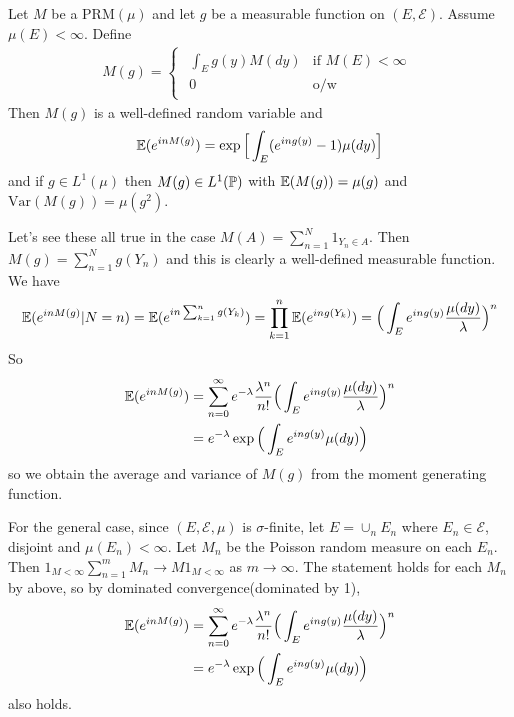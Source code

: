 \documentclass[12pt,a4paper]{report}
\newenvironment{proof}
{\begin{changemargin}{1cm}{0.5cm} 
	}%
	{\end{changemargin}
}
\begin{document}
 Let $M$ be a $\text{PRM}(\mu)$ and let $g$ be a measurable function on $(E, \mathscr{E})$. Assume $\mu(E) < \infty$. Define
\begin{align*}
M(g) = \begin{cases}
\begin{array}{ll}
\int_E g(y) M(dy) & \text{if  } M(E) < \infty \\
0 & \text{o/w}
\end{array}
\end{cases}
\end{align*}
Then $M(g)$ is a well-defined random variable and 
\begin{align*}
\mathbb{E}(e^{inM(g)}) = \exp \Big[ \int_E (e^{ing(y)} -1) \mu(dy) \Big]
\end{align*}
and if $g\in L^1(\mu)$ then $M(g) \in L^1(\mathbb{P})$ with $\mathbb{E}(M(g)) = \mu(g)$ and $\text{Var}(M(g)) = \mu(g^2)$.
\begin{proof}
\pf Let's see these all true in the case $M(A) = \sum_{n=1}^N 1_{Y_n \in A}$. Then $M(g) = \sum_{n=1}^N g(Y_n)$ and this is clearly a well-defined measurable function. We have
\begin{align*}
\mathbb{E}(e^{in M(g)} | N=n) = \mathbb{E}( e^{in \sum_{k=1}^n g(Y_k) }) =\prod_{k=1}^n \mathbb{E}( e^{in  g(Y_k) }) = \Big( \int_E e^{in g(y)} \frac{\mu(dy)}{\lambda} \Big)^n
\end{align*}
So 
\begin{align*}
\mathbb{E}(e^{in M(g)}) &= \sum_{n=0}^{\infty} e^{-\lambda} \frac{\lambda^n}{n!} \Big( \int_E e^{ing(y)} \frac{\mu(dy)}{\lambda} \Big)^n \\
&= e^{-\lambda} \exp \Big( \int_E e^{ing(y)} \mu(dy) \Big)
\end{align*}
so we obtain the average and variance of $M(g)$ from the moment generating function.

\quad For the general case, since $(E, \mathscr{E},\mu)$ is $\sigma$-finite, let $E = \cup_n E_n$ where $E_n \in \mathscr{E}$, disjoint and $\mu(E_n) < \infty$. Let $M_n$ be the Poisson random measure on each $E_n$. Then $1_{M<\infty} \sum_{n=1}^{m} M_{n} \rightarrow M 1_{M<\infty}$ as $m\rightarrow \infty$. The statement holds for each $M_n$ by above, so by dominated convergence(dominated by 1),
\begin{align*}
\mathbb{E}(e^{in M(g)}) &= \sum_{n=0}^{\infty} e^{-\lambda} \frac{\lambda^n}{n!} \Big( \int_E e^{ing(y)} \frac{\mu(dy)}{\lambda} \Big)^n \\
&= e^{-\lambda} \exp \Big( \int_E e^{ing(y)} \mu(dy) \Big)
\end{align*}
also holds.

\eop
\end{proof}
\s
\end{document}
